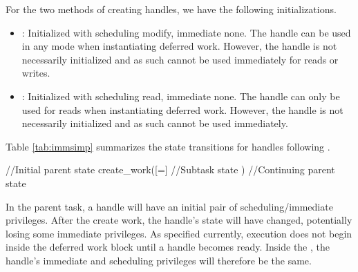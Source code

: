 For the two methods of creating handles, we have the following initializations.
\begin{itemize}
\item {}: Initialized with scheduling modify, immediate none. 
The handle can be used in any mode when instantiating deferred work.
However, the handle is not necessarily initialized and as such cannot be used immediately for reads or writes.
%
\item {}: Initialized with scheduling read, immediate none.
The handle can only be used for reads when instantiating deferred work.
However, the handle is not necessarily initialized and as such cannot be used immediately.
\end{itemize}
Table \ref{tab:immsimp} summarizes the state transitions for handles following \cwork.

\begin{CppCode}
//Initial parent state
create_work([=]{
  //Subtask state
})
//Continuing parent state
\end{CppCode}
In the parent task, a handle will have an initial pair of scheduling/immediate privileges.
After the create work, the handle's state will have changed, potentially losing some immediate privileges.
As specified currently, execution does not begin inside the deferred work block until a handle becomes ready.
Inside the \cwork, the handle's immediate and scheduling privileges will therefore be the same.


